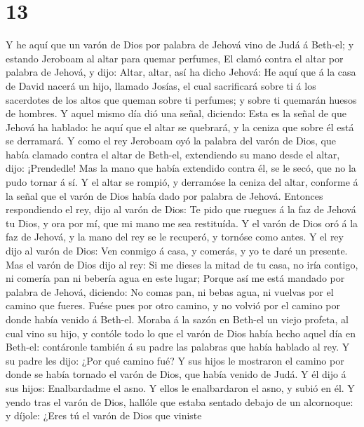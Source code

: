 \hypertarget{section-12}{%
\section{13}\label{section-12}}

 Y he aquí que un varón de Dios por palabra de Jehová vino
de Judá á Beth-el; y estando Jeroboam al altar para quemar perfumes,
 El clamó contra el altar por palabra de Jehová, y dijo:
Altar, altar, así ha dicho Jehová: He aquí que á la casa de David nacerá
un hijo, llamado Josías, el cual sacrificará sobre ti á los sacerdotes
de los altos que queman sobre ti perfumes; y sobre ti quemarán huesos de
hombres.  Y aquel mismo día dió una señal, diciendo: Esta es
la señal de que Jehová ha hablado: he aquí que el altar se quebrará, y
la ceniza que sobre él está se derramará.  Y como el rey
Jeroboam oyó la palabra del varón de Dios, que había clamado contra el
altar de Beth-el, extendiendo su mano desde el altar, dijo: ¡Prendedle!
Mas la mano que había extendido contra él, se le secó, que no la pudo
tornar á sí.  Y el altar se rompió, y derramóse la ceniza
del altar, conforme á la señal que el varón de Dios había dado por
palabra de Jehová.  Entonces respondiendo el rey, dijo al
varón de Dios: Te pido que ruegues á la faz de Jehová tu Dios, y ora por
mí, que mi mano me sea restituída. Y el varón de Dios oró á la faz de
Jehová, y la mano del rey se le recuperó, y tornóse como antes.
 Y el rey dijo al varón de Dios: Ven conmigo á casa, y
comerás, y yo te daré un presente.  Mas el varón de Dios
dijo al rey: Si me dieses la mitad de tu casa, no iría contigo, ni
comería pan ni bebería agua en este lugar;  Porque así me
está mandado por palabra de Jehová, diciendo: No comas pan, ni bebas
agua, ni vuelvas por el camino que fueres.  Fuése pues por
otro camino, y no volvió por el camino por donde había venido á Beth-el.
 Moraba á la sazón en Beth-el un viejo profeta, al cual
vino su hijo, y contóle todo lo que el varón de Dios había hecho aquel
día en Beth-el: contáronle también á su padre las palabras que había
hablado al rey.  Y su padre les dijo: ¿Por qué camino fué?
Y sus hijos le mostraron el camino por donde se había tornado el varón
de Dios, que había venido de Judá.  Y él dijo á sus hijos:
Enalbardadme el asno. Y ellos le enalbardaron el asno, y subió en él.
 Y yendo tras el varón de Dios, hallóle que estaba sentado
debajo de un alcornoque: y díjole: ¿Eres tú el varón de Dios que viniste
